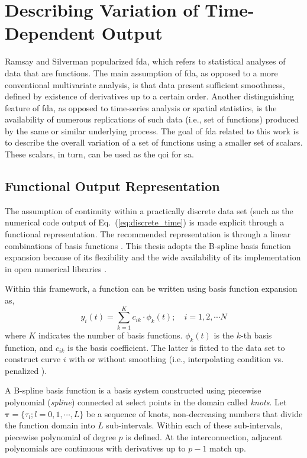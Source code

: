 \section{Describing Variation of Time-Dependent Output}\label{sec:sa_time_dependent_variation}

Ramsay and Silverman \cite{Ramsay2005} popularized \gls{fda}, which refers to statistical analyses of data that are functions.
The main assumption of \gls{fda}, as opposed to a more conventional multivariate analysis, is that data present sufficient smoothness, defined by existence of derivatives up to a certain order.
Another distinguishing feature of \gls{fda}, as opposed to time-series analysis or spatial statistics, is the availability of numerous replications of such data (i.e., set of functions) produced by the same or similar underlying process. 
The goal of \gls{fda} related to this work is to describe the overall variation of a set of functions using a smaller set of scalars.
These scalars, in turn, can be used as the \gls{qoi} for \gls{sa}.

\subsection{Functional Output Representation}\label{sub:sa_spline}

The assumption of continuity within a practically discrete data set (such as the numerical code output of Eq.~(\ref{eq:discrete_time}) is made explicit through a functional representation.
The recommended representation is through a linear combinations of basis functions \cite{Ramsay2005}.
This thesis adopts the B-spline basis function \cite{Gillies2010} expansion because of its flexibility \cite{Eilers1996,Eilers2010} 
and the wide availability of its implementation in open numerical libraries \cite{RCT2017}.

Within this framework, a function can be written using basis function expansion as,
\begin{equation}
	y_i (t) = \sum_{k = 1}^{K} c_{ik} \cdot \phi_k (t); \quad i = 1, 2, \cdots N
\label{eq:basis_function_expansion}
\end{equation}
where $K$ indicates the number of basis functions. $\phi_k (t)$ is the $k$-th basis function, 
and $c_{ik}$ is the basis coefficient.
The latter is fitted to the data set to construct curve $i$ with or without smoothing (i.e., interpolating condition vs. penalized ).

A B-spline basis function is a basis system constructed using piecewise polynomial (\emph{spline}) connected at select points in the domain called \emph{knots}.
Let $\boldsymbol{\tau}=\{\tau_l; l = 0,1,\cdots, L\}$ be a sequence of knots, non-decreasing numbers that divide the function domain into $L$ sub-intervals.
Within each of these sub-intervals, piecewise polynomial of degree $p$ is defined.
At the interconnection, adjacent polynomials are continuous with derivatives up to $p-1$ match up.

